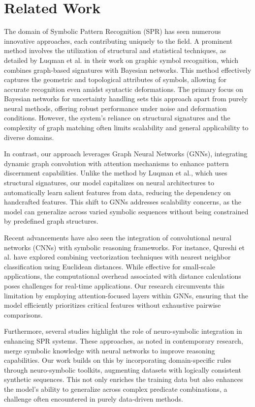 \documentclass{article}
\begin{document}
\section{Related Work}
The domain of Symbolic Pattern Recognition (SPR) has seen numerous innovative approaches, each contributing uniquely to the field. A prominent method involves the utilization of structural and statistical techniques, as detailed by Luqman et al. in their work on graphic symbol recognition, which combines graph-based signatures with Bayesian networks. This method effectively captures the geometric and topological attributes of symbols, allowing for accurate recognition even amidst syntactic deformations. The primary focus on Bayesian networks for uncertainty handling sets this approach apart from purely neural methods, offering robust performance under noise and deformation conditions. However, the system's reliance on structural signatures and the complexity of graph matching often limits scalability and general applicability to diverse domains.

In contrast, our approach leverages Graph Neural Networks (GNNs), integrating dynamic graph convolution with attention mechanisms to enhance pattern discernment capabilities. Unlike the method by Luqman et al., which uses structural signatures, our model capitalizes on neural architectures to automatically learn salient features from data, reducing the dependency on handcrafted features. This shift to GNNs addresses scalability concerns, as the model can generalize across varied symbolic sequences without being constrained by predefined graph structures.

Recent advancements have also seen the integration of convolutional neural networks (CNNs) with symbolic reasoning frameworks. For instance, Qureshi et al. have explored combining vectorization techniques with nearest neighbor classification using Euclidean distances. While effective for small-scale applications, the computational overhead associated with distance calculations poses challenges for real-time applications. Our research circumvents this limitation by employing attention-focused layers within GNNs, ensuring that the model efficiently prioritizes critical features without exhaustive pairwise comparisons.

Furthermore, several studies highlight the role of neuro-symbolic integration in enhancing SPR systems. These approaches, as noted in contemporary research, merge symbolic knowledge with neural networks to improve reasoning capabilities. Our work builds on this by incorporating domain-specific rules through neuro-symbolic toolkits, augmenting datasets with logically consistent synthetic sequences. This not only enriches the training data but also enhances the model's ability to generalize across complex predicate combinations, a challenge often encountered in purely data-driven methods.
\end{document}
